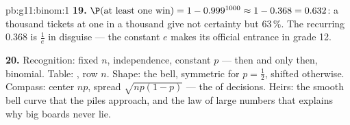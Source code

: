 \begin{solution}{pb:g11:binom:1}
\textbf{19.} $\P(\text{at least one win}) = 1 - 0.999^{1000}
\approx 1 - 0.368 = 0.632$: a thousand tickets at one in a
thousand give not certainty but $63\,\%$. The recurring
$0.368$ is $\frac1e$ in disguise --- the constant $e$ makes
its official entrance in grade 12.

\textbf{20.} Recognition: fixed $n$, independence, constant
$p$ --- then and only then, binomial. Table: , row $n$. Shape: the bell, symmetric for
$p = \frac12$, shifted otherwise. Compass: center $np$,
spread $\sqrt{np(1-p)}$ --- the  of decisions.
Heirs: the smooth bell curve that the piles approach, and the
law of large numbers that explains why big boards never lie.
\end{solution}
